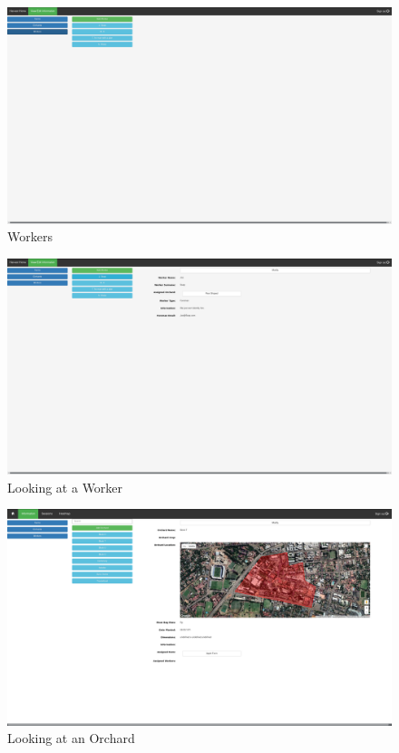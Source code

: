 \documentclass[11pt]{article}
\begin{document}
\begin{figure}
 \centering
 \includegraphics[width=12cm, keepaspectratio]{Images/webInformation-Workers.png}
 \caption{Workers}
 \label{InformationPageWorkers}
\end{figure}

\begin{figure}
 \centering
 \includegraphics[width=12cm, keepaspectratio]{Images/webInformation-LookWorker.png}
 \caption{Looking at a Worker}
 \label{InformationPageJoe}
\end{figure}

\begin{figure}
 \centering
 \includegraphics[width=12cm, keepaspectratio]{Images/webViewOrchard.png}
 \caption{Looking at an Orchard}
 \label{InformationPagePear}
\end{figure}
\end{document}

